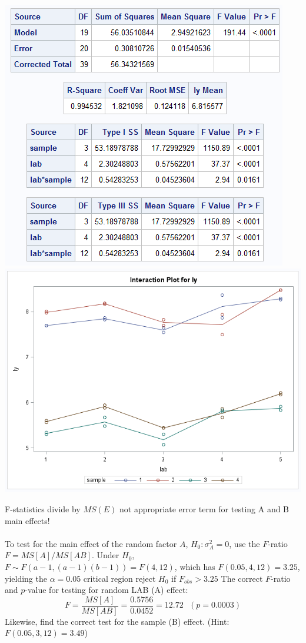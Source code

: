 \begin{center}
\includegraphics[scale=0.7]{MilkGLM}\includegraphics[scale=0.5]{MilkGLM2}
\end{center}

F-statistics divide by $MS(E)$ not appropriate error term for testing A and B main effects! \\~\\

To test for the main effect of the random factor $A$, $H_0: \sigma_A^2=0$, use the $F$-ratio $F=MS[A]/MS[AB]$.  Under $H_0$,
$F \sim F(a-1,(a-1)(b-1))=F(4,12)$, which has $F(0.05,4,12)=3.25$, yielding the $\alpha=0.05$ critical region reject $H_0$ if $F_{obs}>3.25$
The correct $F$-ratio and $p$-value for testing for random LAB (A) effect: 
$$ F=\frac{MS[A]}{MS[AB]} = \frac{0.5756}{0.0452}=12.72~~~(p=0.0003) $$
Likewise, find the correct test for the sample (B) effect. (Hint: $F(0.05,3,12)=3.49$)\\~\\~\\~\\~\\~\\

